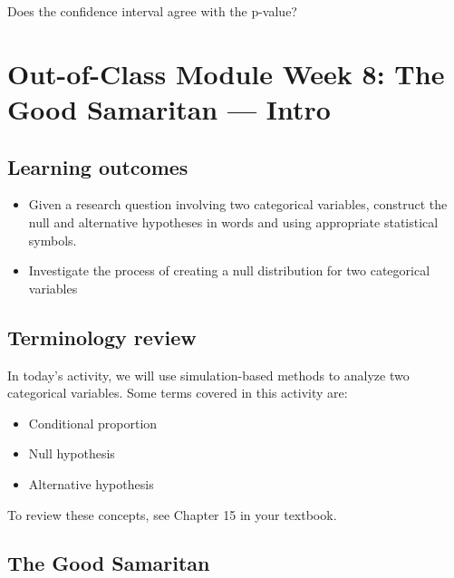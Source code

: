 \documentclass[
]{report}
\begin{document}
\vspace{0.8in}

Does the confidence interval agree with the p-value?

\vspace{0.5in}

\newpage

\hypertarget{out-of-class-module-week-8-the-good-samaritan-intro}{%
\section{Out-of-Class Module Week 8: The Good Samaritan --- Intro}\label{out-of-class-module-week-8-the-good-samaritan-intro}}


\hypertarget{learning-outcomes-14}{%
\subsection{Learning outcomes}\label{learning-outcomes-14}}

\begin{itemize}
\item
  Given a research question involving two categorical variables, construct the null and alternative hypotheses
  in words and using appropriate statistical symbols.
\item
  Investigate the process of creating a null distribution for two categorical variables
\end{itemize}

\hypertarget{terminology-review-13}{%
\subsection{Terminology review}\label{terminology-review-13}}

In today's activity, we will use simulation-based methods to analyze two categorical variables. Some terms covered in this activity are:

\begin{itemize}
\item
  Conditional proportion
\item
  Null hypothesis
\item
  Alternative hypothesis
\end{itemize}

To review these concepts, see Chapter 15 in your textbook.

\hypertarget{the-good-samaritan}{%
\subsection{The Good Samaritan}\label{the-good-samaritan}}
\end{document}

